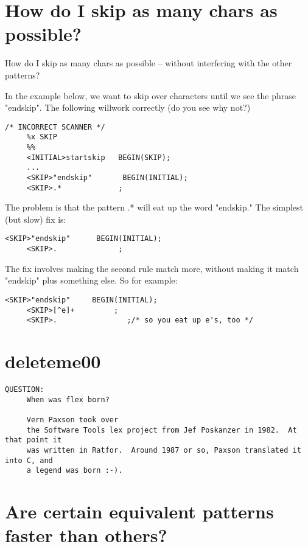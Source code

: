 \documentclass[openany,oneside]{book}
\begin{document}
\section{How do I skip as many chars as possible?}


How do I skip as many chars as possible – without interfering with the other
patterns?

In the example below, we want to skip over characters until we see the phrase
"endskip". The following willwork correctly (do you see why not?)
\begin{verbatim}
/* INCORRECT SCANNER */
     %x SKIP
     %%
     <INITIAL>startskip   BEGIN(SKIP);
     ...
     <SKIP>"endskip"       BEGIN(INITIAL);
     <SKIP>.*             ;
\end{verbatim}


The problem is that the pattern .* will eat up the word "endskip." 
The simplest (but slow) fix is:
\begin{verbatim}
<SKIP>"endskip"      BEGIN(INITIAL);
     <SKIP>.              ;
\end{verbatim}


The fix involves making the second rule match more, without
making it match "endskip" plus something else.  So for example:
\begin{verbatim}
<SKIP>"endskip"     BEGIN(INITIAL);
     <SKIP>[^e]+         ;
     <SKIP>.		        ;/* so you eat up e's, too */
\end{verbatim}

\section{deleteme00}

\begin{verbatim}
QUESTION:
     When was flex born?
     
     Vern Paxson took over
     the Software Tools lex project from Jef Poskanzer in 1982.  At that point it
     was written in Ratfor.  Around 1987 or so, Paxson translated it into C, and
     a legend was born :-).
\end{verbatim}

\section{Are certain equivalent patterns faster than others?}
\end{document}
